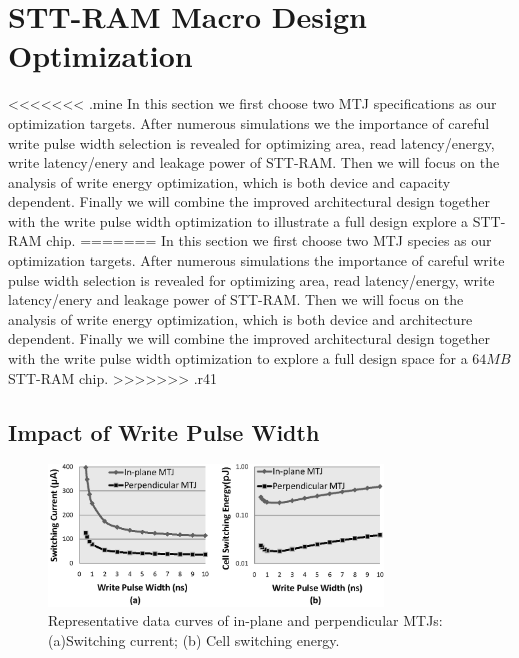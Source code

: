 \section{STT-RAM Macro Design Optimization} \label{sec:opt}
<<<<<<< .mine
In this section we first choose two MTJ specifications as our optimization targets. After numerous simulations we the importance of careful write pulse width selection is revealed for optimizing area, read latency/energy, write latency/enery and leakage power of STT-RAM. Then we will focus on the analysis of write energy optimization, which is both device and capacity dependent. Finally we will combine the improved architectural design together with the write pulse width optimization to illustrate a full design explore a STT-RAM chip.
=======
In this section we first choose two MTJ species as our optimization targets. After numerous simulations the importance of careful write pulse width selection is revealed for optimizing area, read latency/energy, write latency/enery and leakage power of STT-RAM. Then we will focus on the analysis of write energy optimization, which is both device and architecture dependent. Finally we will combine the improved architectural design together with the write pulse width optimization to explore a full design space for a $64MB$ STT-RAM chip.
>>>>>>> .r41

\subsection{Impact of Write Pulse Width}

\begin{figure}[t]
  \centering
  \includegraphics[width=3.5in]{fig/MTJSpec.eps}
  \vspace{-10pt}
  \caption{Representative data curves of in-plane and perpendicular MTJs: (a)Switching current; (b) Cell switching energy.}
  \label{fig:specs}
  \vspace{-5pt}
\end{figure}

